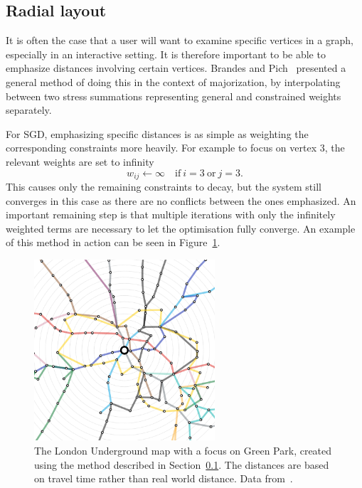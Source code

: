 \subsection{Radial layout}
\label{sec:sgd_radial}

It is often the case that a user will want to examine specific vertices in a graph, especially in an interactive setting. It is therefore important to be able to emphasize distances involving certain vertices.
Brandes and Pich~\cite{Brandes2011} presented a general method of doing this in the context of majorization, by interpolating between two stress summations representing general and constrained weights separately.

For SGD, emphasizing specific distances is as simple as weighting the corresponding constraints more heavily.
For example to focus on vertex $3$, the relevant weights are set to infinity
\begin{equation}
  w_{ij} \leftarrow \infty \quad \text{if}\ i=3\ \text{or}\ j=3.
\end{equation}
This causes only the remaining constraints to decay, but the system still converges in this case as there are no conflicts between the ones emphasized. An important remaining step is that multiple iterations with only the infinitely weighted terms are necessary to let the optimisation fully converge. 
An example of this method in action can be seen in Figure~\ref{fig:tube}.

\begin{figure}
  \centering
  \includegraphics[width=0.6\textwidth]{stress/tube.png}
  \caption[The London tube map with a focus on Green Park station]{The London Underground map with a focus on Green Park, created using the method described in Section~\ref{sec:sgd_radial}. The distances are based on travel time rather than real world distance.
  Data from~\cite{Trotman2016}.}
  \label{fig:tube}
\end{figure}

